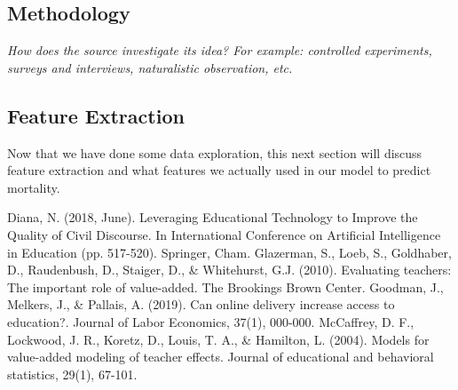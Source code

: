 \documentclass[12pt, final]{article}
\begin{document}
\subsection{Methodology}
\textit{How does the source investigate its idea? For example: controlled experiments, surveys and interviews, naturalistic observation, etc.}

\subsection{Feature Extraction}
Now that we have done some data exploration, this next section will discuss feature extraction and what features we actually used in our model to predict mortality.

  \begin{thebibliography}{1}
    Diana, N. (2018, June). Leveraging Educational Technology to Improve the Quality of Civil Discourse. In International Conference on Artificial Intelligence in Education (pp. 517-520). Springer, Cham.
     Glazerman, S., Loeb, S., Goldhaber, D., Raudenbush, D., Staiger, D., \& Whitehurst, G.J. (2010). Evaluating teachers: The important role of value-added. The Brookings Brown Center.
     Goodman, J., Melkers, J., \& Pallais, A. (2019). Can online delivery increase access to education?. Journal of Labor Economics, 37(1), 000-000.
     McCaffrey, D. F., Lockwood, J. R., Koretz, D., Louis, T. A., \& Hamilton, L. (2004). Models for value-added modeling of teacher effects. Journal of educational and behavioral statistics, 29(1), 67-101.
  \end{thebibliography}
\end{document}
